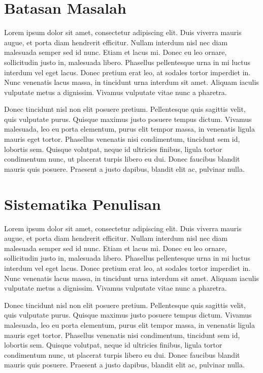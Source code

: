 \section{Batasan Masalah}
Lorem ipsum dolor sit amet, consectetur adipiscing elit. Duis viverra mauris augue, et porta diam hendrerit efficitur. Nullam interdum nisl nec diam malesuada semper sed id nunc. Etiam et lacus mi. Donec eu leo ornare, sollicitudin justo in, malesuada libero. Phasellus pellentesque urna in mi luctus interdum vel eget lacus. Donec pretium erat leo, at sodales tortor imperdiet in. Nunc venenatis lacus massa, in tincidunt urna interdum sit amet. Aliquam iaculis vulputate metus a dignissim. Vivamus vulputate vitae nunc a pharetra.

Donec tincidunt nisl non elit posuere pretium. Pellentesque quis sagittis velit, quis vulputate purus. Quisque maximus justo posuere tempus dictum. Vivamus malesuada, leo eu porta elementum, purus elit tempor massa, in venenatis ligula mauris eget tortor. Phasellus venenatis nisi condimentum, tincidunt sem id, lobortis sem. Quisque volutpat, neque id ultricies finibus, ligula tortor condimentum nunc, ut placerat turpis libero eu dui. Donec faucibus blandit mauris quis posuere. Praesent a justo dapibus, blandit elit ac, pulvinar nulla. 



\section{Sistematika Penulisan}
Lorem ipsum dolor sit amet, consectetur adipiscing elit. Duis viverra mauris augue, et porta diam hendrerit efficitur. Nullam interdum nisl nec diam malesuada semper sed id nunc. Etiam et lacus mi. Donec eu leo ornare, sollicitudin justo in, malesuada libero. Phasellus pellentesque urna in mi luctus interdum vel eget lacus. Donec pretium erat leo, at sodales tortor imperdiet in. Nunc venenatis lacus massa, in tincidunt urna interdum sit amet. Aliquam iaculis vulputate metus a dignissim. Vivamus vulputate vitae nunc a pharetra.

Donec tincidunt nisl non elit posuere pretium. Pellentesque quis sagittis velit, quis vulputate purus. Quisque maximus justo posuere tempus dictum. Vivamus malesuada, leo eu porta elementum, purus elit tempor massa, in venenatis ligula mauris eget tortor. Phasellus venenatis nisi condimentum, tincidunt sem id, lobortis sem. Quisque volutpat, neque id ultricies finibus, ligula tortor condimentum nunc, ut placerat turpis libero eu dui. Donec faucibus blandit mauris quis posuere. Praesent a justo dapibus, blandit elit ac, pulvinar nulla. 

